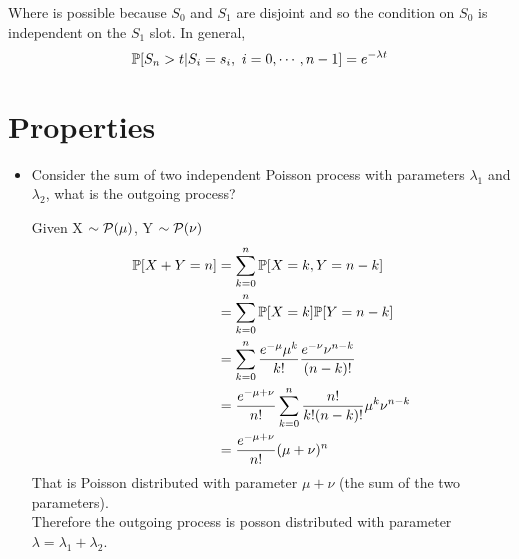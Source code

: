 Where  is possible because $S_0$ and $S_1$ are disjoint and so the condition on $S_0$ is independent on the $S_1$ slot.
In general,
\begin{equation}
	\mathbb{P}[S_n > t | S_i = s_i, ~i=0,\cdots,n-1] = e^{-\lambda t}
\end{equation}

\section{Properties}
	\begin{itemize}
		\item Consider the sum of two independent Poisson process with parameters $\lambda_1$ and $\lambda_2$, what is the outgoing process?
		\begin{figure}[H]
			\centering
		\end{figure}
		Given X $\sim \mathcal P(\mu)$, Y $\sim \mathcal P(\nu)$
		\begin{equation}
			\begin{split}
				 \mathbb{P}[X + Y = n] &=	\sum\limits_{k=0}^n \mathbb{P}[X = k, Y = n - k] \\
				 &=	\sum\limits_{k=0}^n \mathbb{P}[X = k] \mathbb{P}[Y = n - k] \\
				 &=	\sum\limits_{k=0}^n \frac{e^{-\mu} \mu^k}{k!} \frac{e^{-\nu}\nu^{n-k}}{(n-k)!}\\
				 &=	\frac{e^{-\mu + \nu}}{n!}\sum\limits_{k=0}^n \frac{n!}{k!(n-k)!}\mu^k\nu^{n-k}\\
				 &=	\frac{e^{-\mu + \nu}}{n!}(\mu + \nu)^n
			 \end{split}
		\end{equation}
		That is Poisson distributed with parameter $\mu + \nu$ (the sum of the two parameters). \\
		Therefore the outgoing process is posson distributed with parameter $\lambda = \lambda_1 + \lambda_2$.


\end{itemize}
